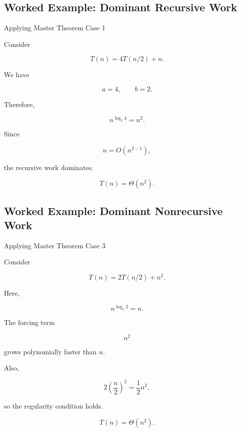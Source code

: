 \subsection{Worked Example: Dominant Recursive Work}
\label{subsec:worked-master-case-one}

\begin{workedexamplebox}{Applying Master Theorem Case 1}

Consider

\[
T(n)=4T(n/2)+n.
\]

We have

\[
a=4,
\qquad
b=2.
\]

Therefore,

\[
n^{\log_2 4}
=
n^2.
\]

Since

\[
n
=
O(n^{2-1}),
\]

the recursive work dominates.

\begin{answerbox}
\[
\boxed{
T(n)=\Theta(n^2).
}
\]
\end{answerbox}

\end{workedexamplebox}

\subsection{Worked Example: Dominant Nonrecursive Work}
\label{subsec:worked-master-case-three}

\begin{workedexamplebox}{Applying Master Theorem Case 3}

Consider

\[
T(n)=2T(n/2)+n^2.
\]

Here,

\[
n^{\log_2 2}=n.
\]

The forcing term

\[
n^2
\]

grows polynomially faster than \(n\).

Also,

\[
2\left(\frac n2\right)^2
=
\frac12n^2,
\]

so the regularity condition holds.

\begin{answerbox}
\[
\boxed{
T(n)=\Theta(n^2).
}
\]
\end{answerbox}

\end{workedexamplebox}

